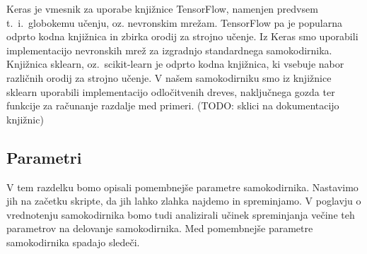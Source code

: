\documentclass[12pt,a4paper]{article}
\begin{document}
Keras je vmesnik za uporabe knjižnice TensorFlow, namenjen predvsem t.~i.\ globokemu učenju, oz. nevronskim mrežam. 
TensorFlow pa je popularna odprto kodna knjižnica in zbirka orodij za strojno učenje.
Iz Keras smo uporabili implementacijo nevronskih mrež za izgradnjo standardnega samokodirnika.
Knjižnica sklearn, oz.\ scikit-learn je odprto kodna knjižnica, ki vsebuje nabor različnih orodij za strojno učenje.
V našem samokodirniku smo iz knjižnice sklearn uporabili implementacijo odločitvenih dreves, naključnega gozda ter funkcije za računanje razdalje med primeri.
(TODO: sklici na dokumentacijo knjižnic)


\subsection{Parametri}

V tem razdelku bomo opisali pomembnejše parametre samokodirnika. Nastavimo jih na začetku skripte, da jih lahko zlahka najdemo in spreminjamo.
V poglavju o vrednotenju samokodirnika bomo tudi analizirali učinek spreminjanja večine teh parametrov na delovanje samokodirnika.
Med pomembnejše parametre samokodirnika spadajo sledeči.
\end{document}
